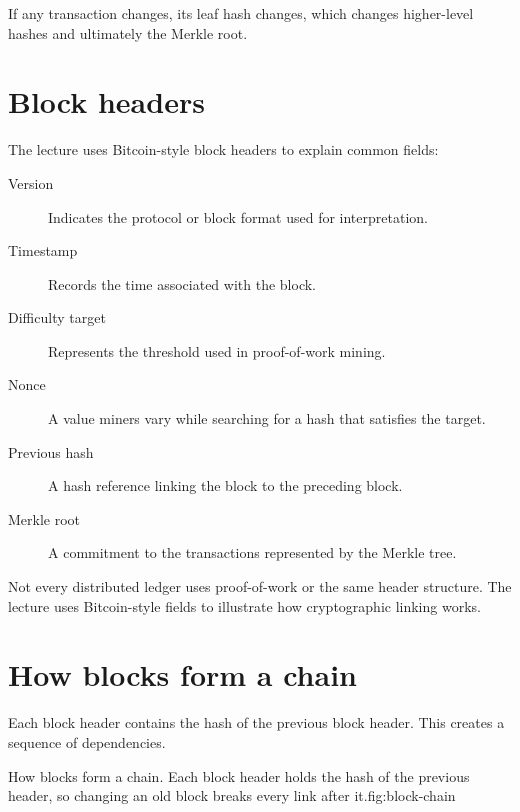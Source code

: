 If any transaction changes, its leaf hash changes, which changes higher-level hashes and ultimately the Merkle root.

\section{Block headers}

The lecture uses Bitcoin-style block headers to explain common fields:

\begin{description}
  \item[Version] Indicates the protocol or block format used for interpretation.
  \item[Timestamp] Records the time associated with the block.
  \item[Difficulty target] Represents the threshold used in proof-of-work mining.
  \item[Nonce] A value miners vary while searching for a hash that satisfies the target.
  \item[Previous hash] A hash reference linking the block to the preceding block.
  \item[Merkle root] A commitment to the transactions represented by the Merkle tree.
\end{description}

Not every distributed ledger uses proof-of-work or the same header structure. The lecture uses Bitcoin-style fields to illustrate how cryptographic linking works.

\section{How blocks form a chain}

Each block header contains the hash of the previous block header. This creates a sequence of dependencies.

\begin{utpfig}{How blocks form a chain. Each block header holds the hash of the previous header, so changing an old block breaks every link after it.}{fig:block-chain}
\end{utpfig}

